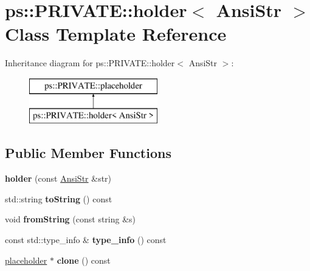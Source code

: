 \hypertarget{classps_1_1PRIVATE_1_1holder_3_01AnsiStr_01_4}{}\section{ps\+:\+:P\+R\+I\+V\+A\+T\+E\+:\+:holder$<$ Ansi\+Str $>$ Class Template Reference}
\label{classps_1_1PRIVATE_1_1holder_3_01AnsiStr_01_4}
Inheritance diagram for ps\+:\+:P\+R\+I\+V\+A\+T\+E\+:\+:holder$<$ Ansi\+Str $>$\+:\begin{figure}[H]
\begin{center}
\leavevmode
\includegraphics[height=2.000000cm]{classps_1_1PRIVATE_1_1holder_3_01AnsiStr_01_4}
\end{center}
\end{figure}
\subsection*{Public Member Functions}
\begin{DoxyCompactItemize}
\item 
\hypertarget{classps_1_1PRIVATE_1_1holder_3_01AnsiStr_01_4_af5d43f1b7b14dd48b7d5b6f8cd1bcc14}{}{\bfseries holder} (const \hyperlink{classps_1_1base_1_1CAString}{Ansi\+Str} \&str)\label{classps_1_1PRIVATE_1_1holder_3_01AnsiStr_01_4_af5d43f1b7b14dd48b7d5b6f8cd1bcc14}

\item 
\hypertarget{classps_1_1PRIVATE_1_1holder_3_01AnsiStr_01_4_abde716286bf24b45317e3a36ec52a200}{}std\+::string {\bfseries to\+String} () const \label{classps_1_1PRIVATE_1_1holder_3_01AnsiStr_01_4_abde716286bf24b45317e3a36ec52a200}

\item 
\hypertarget{classps_1_1PRIVATE_1_1holder_3_01AnsiStr_01_4_a55316f448722b9c9a0db5d686d9ecc91}{}void {\bfseries from\+String} (const string \&s)\label{classps_1_1PRIVATE_1_1holder_3_01AnsiStr_01_4_a55316f448722b9c9a0db5d686d9ecc91}

\item 
\hypertarget{classps_1_1PRIVATE_1_1holder_3_01AnsiStr_01_4_a46d3a8950ba041f9f62d6a9424bea07d}{}const std\+::type\+\_\+info \& {\bfseries type\+\_\+info} () const \label{classps_1_1PRIVATE_1_1holder_3_01AnsiStr_01_4_a46d3a8950ba041f9f62d6a9424bea07d}

\item 
\hypertarget{classps_1_1PRIVATE_1_1holder_3_01AnsiStr_01_4_a8344041badd357e3b79e071a993a8d6a}{}\hyperlink{classps_1_1PRIVATE_1_1placeholder}{placeholder} $\ast$ {\bfseries clone} () const \label{classps_1_1PRIVATE_1_1holder_3_01AnsiStr_01_4_a8344041badd357e3b79e071a993a8d6a}

\end{DoxyCompactItemize}
